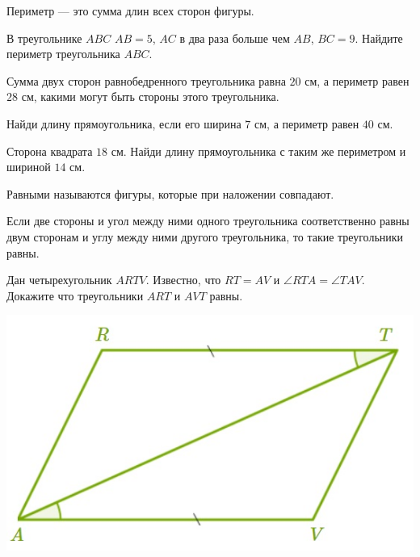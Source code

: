 \begin{class}[number=5]
	\begin{definit}
		Периметр --- это сумма длин всех сторон фигуры.
	\end{definit}
	\begin{listofex}
		\item В треугольнике \(ABC\) \(AB = 5\), \(AC\) в два раза больше чем \( AB \), \(BC = 9\). Найдите периметр треугольника \( ABC \).
		\item Сумма двух сторон равнобедренного треугольника равна \( 20 \) см, а периметр равен \( 28 \) см, какими могут быть стороны этого треугольника.
		\item Найди длину прямоугольника, если его ширина \(7\) см, а периметр равен \(40\) см.
		\item Сторона квадрата \(18\) см. Найди длину прямоугольника с таким же периметром и шириной \(14\) см.
	\end{listofex}
	\begin{definit}
		Равными называются фигуры, которые при наложении совпадают.
	\end{definit}
	\begin{definit}
		Если две стороны и угол между ними одного треугольника соответственно равны двум сторонам и углу между ними другого треугольника, то такие треугольники равны.
	\end{definit}
	\begin{listofex}[resume]
		\item
		\begin{minipage}[t]{0.63\linewidth}
			Дан четырехугольник \( ARTV \). Известно, что \( RT=AV \) и \( \angle RTA = \angle TAV \). Докажите что треугольники \( ART \) и \( AVT \) равны.
		\end{minipage}
		\hspace{0.03\linewidth}
		\begin{minipage}[c]{0.34\linewidth}
			\includegraphics[width=\linewidth]{pics/G71M4C5-3.jpg}

\end{minipage}
\end{listofex}
\end{class}
